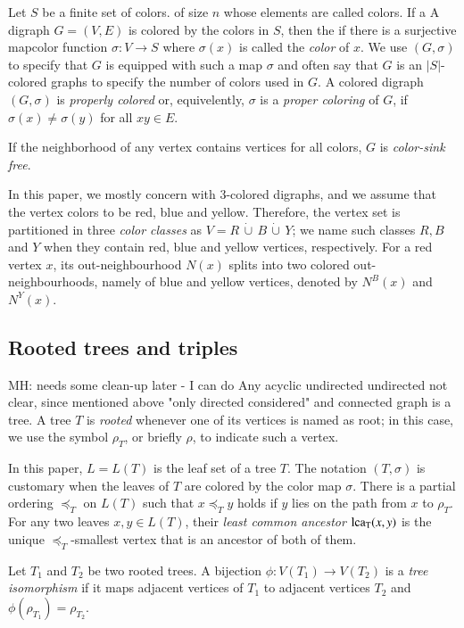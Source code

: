 \documentclass[final,3p,times]{elsarticle}
\newcommand{\TODO}[1]{\begingroup\color{red}#1\endgroup}
\newcommand{\OLD}[1]{\begingroup\tiny\color{gray}#1\endgroup}
\newcommand{\mh}[1]{\begingroup\color{blue}#1\endgroup}
\begin{document}
Let $S$ be a finite set \mh{of colors}. \OLD{of size $n$ whose elements are called colors.} \OLD{If a}
\mh{A} digraph $G=(V,E)$ is colored by the colors in $S$, \OLD{then the} 
\mh{if there is a} surjective \mh{map}\OLD{color
function} $\sigma: V\to S$ \mh{where 
$\sigma(x)$ is called the \emph{color} of $x$. We use $(G,\sigma)$ to specify
that $G$ is equipped with such a map $\sigma$ and often say that $G$ 
is an $|S|$-colored graphs to specify the number of colors used in $G$. 
A colored digraph $(G, \sigma)$ 
is \emph{properly colored} or, equivelently, $\sigma$ is a \emph{proper coloring}
of $G$, if $\sigma(x)\neq \sigma(y)$ for all $xy\in E$. }

If the neighborhood of any vertex contains
vertices for all colors, $G$ is \emph{color-sink free}. 


In this paper, we mostly concern with 3-colored digraphs, and we assume that the vertex colors to be red, blue and yellow. Therefore, the vertex set is partitioned in three \emph{color classes} as $V=R\,\dot{\cup}\, B\,\dot{\cup}\, Y$; we name such classes $R,B$ and $Y$ when they contain red, blue and yellow vertices, respectively. For a red vertex $x$, its out-neighbourhood $N(x)$ splits into two colored out-neighbourhoods, namely of blue and yellow vertices, denoted by $N^{B}(x)$ and $N^{Y}(x)$. 

\subsection{Rooted trees and triples} \TODO{MH: needs some clean-up later - I can do}
Any acyclic undirected \TODO{undirected not clear, since mentioned above "only directed considered"} and connected graph is a tree. A tree $T$ is
\emph{rooted} whenever one of its vertices is named as root; in this case, we
use the symbol $\rho_T$, or briefly $\rho$, to indicate such a vertex.  

In this paper, $L=L(T)$ is the leaf set of a tree $T$. The notation $(T,\sigma)$ is customary when the leaves of $T$ are colored by the color map $\sigma$. There is a partial ordering $\preceq_T$ on $L(T)$ such that $x\preceq_T y$ holds if $y$ lies on the path from $x$ to $\rho_T$. For any two leaves $x,y\in L(T)$, their \emph{least common ancestor} ${\rm{lca_T}}(x,y)$ is the unique $\preceq_T$-smallest vertex that is an ancestor of both of them.

Let $T_1$ and $T_2$ be two rooted trees. A bijection $\phi:V(T_1) \rightarrow V(T_2)$ is a \emph{tree isomorphism} if it maps adjacent vertices of $T_1$ to adjacent vertices $T_2$ and  $\phi(\rho_{T_1})=\rho_{T_2}$.
\end{document}
